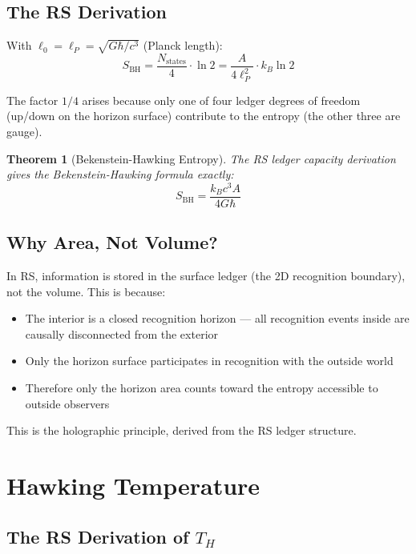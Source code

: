 \documentclass[12pt,a4paper]{article}
\newtheorem{theorem}{Theorem}[section]
\theoremstyle{definition}
\theoremstyle{remark}
\begin{document}
\subsection{The RS Derivation}

With $\ell_0 = \ell_P = \sqrt{G\hbar/c^3}$ (Planck length):
\begin{equation}
S_\mathrm{BH} = \frac{N_\mathrm{states}}{4} \cdot \ln 2 = \frac{A}{4\ell_P^2} \cdot k_B \ln 2
\end{equation}

The factor $1/4$ arises because only one of four ledger degrees of freedom (up/down on 
the horizon surface) contribute to the entropy (the other three are gauge).

\begin{theorem}[Bekenstein-Hawking Entropy]
The RS ledger capacity derivation gives the Bekenstein-Hawking formula exactly:
\begin{equation}
S_\mathrm{BH} = \frac{k_B c^3 A}{4 G\hbar}
\end{equation}
\end{theorem}

\subsection{Why Area, Not Volume?}

In RS, information is stored in the surface ledger (the 2D recognition boundary), 
not the volume. This is because:
\begin{itemize}
\item The interior is a closed recognition horizon — all recognition events inside 
are causally disconnected from the exterior
\item Only the horizon surface participates in recognition with the outside world
\item Therefore only the horizon area counts toward the entropy accessible to outside observers
\end{itemize}

This is the holographic principle, derived from the RS ledger structure.

\section{Hawking Temperature}

\subsection{The RS Derivation of $T_H$}
\end{document}
